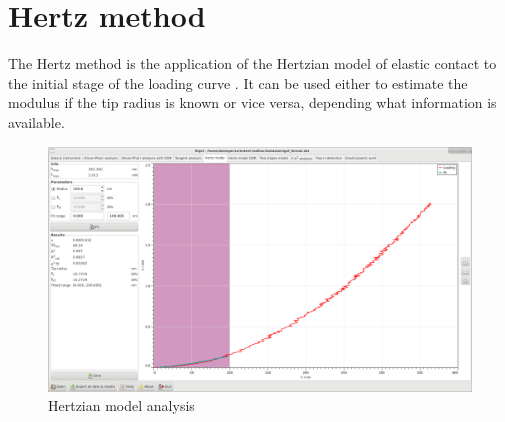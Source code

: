 \section{Hertz method} \label{hertz}
The Hertz method is the application of the Hertzian model of elastic contact to the initial stage of the loading curve \cite{Hertz}. 
It can be used either to estimate the modulus if the tip radius is known or vice versa, depending what information is available.

\begin{figure}[h]
  \centering
  \includegraphics[width=\textwidth]{images/screen-hertz}
  \caption{Hertzian model analysis}
\end{figure}

